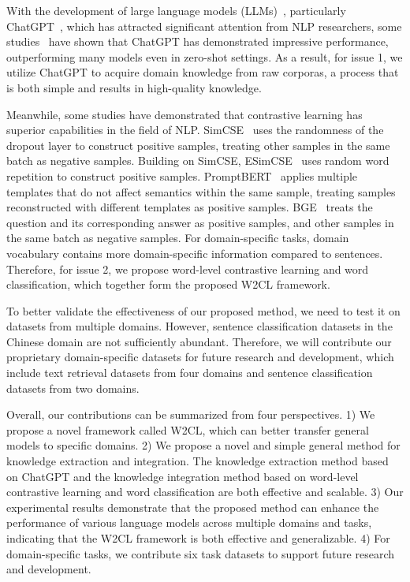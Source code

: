 With the development of large language models (LLMs)~\cite{bert,lm5,lm1,roberta,lm6,lm2,lm4,lm3}, particularly ChatGPT~\cite{gpt}, which has attracted significant attention from NLP researchers, some studies~\cite{gptuse2,gptuse1,gptuse5,gptuse4,gptuse3} have shown that ChatGPT has demonstrated impressive performance, outperforming many models even in zero-shot settings. As a result, for issue 1, we utilize ChatGPT to acquire domain knowledge from raw corporas, a process that is both simple and results in high-quality knowledge. 

Meanwhile, some studies have demonstrated that contrastive learning has superior capabilities in the field of NLP. SimCSE~\cite{simcse} uses the randomness of the dropout layer to construct positive samples, treating other samples in the same batch as negative samples. Building on SimCSE,   ESimCSE~\cite{esimcse} uses random word repetition to construct positive samples. PromptBERT~\cite{promptbert} applies multiple templates that do not affect semantics within the same sample, treating samples reconstructed with different templates as positive samples. BGE~\cite{bge} treats the question and its corresponding answer as positive samples, and other samples in the same batch as negative samples. For domain-specific tasks, domain vocabulary contains more domain-specific information compared to sentences. Therefore, for issue 2, we propose word-level contrastive learning and word classification, which together form the proposed W2CL framework.

To better validate the effectiveness of our proposed method, we need to test it on datasets from multiple domains. However, sentence classification datasets in the Chinese domain are not sufficiently abundant. Therefore, we will contribute our proprietary domain-specific datasets for future research and development, which include text retrieval datasets from four domains and sentence classification datasets from two domains.

Overall, our contributions can be summarized from four perspectives. 1) We propose a novel framework called W2CL, which can better transfer general models to specific domains. 2) We propose a novel and simple general method for knowledge extraction and integration. The knowledge extraction method based on ChatGPT and the knowledge integration method based on word-level contrastive learning and word classification are both effective and scalable. 3) Our experimental results demonstrate that the proposed method can enhance the performance of various language models across multiple domains and tasks, indicating that the W2CL framework is both effective and generalizable. 4) For domain-specific tasks, we contribute six task datasets to support future research and development.


